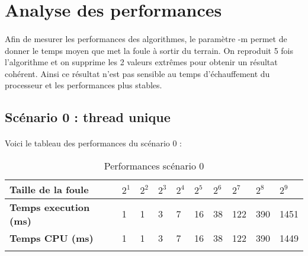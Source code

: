 \documentclass[12pt,oneside,a4paper]{article}
\begin{document}
\section{Analyse des performances}
\paragraph{}
Afin de mesurer les performances des algorithmes, le paramètre -m permet de 
donner le temps moyen que met la foule à sortir du terrain. On reproduit 5 fois
l'algorithme et on supprime les 2 valeurs extrêmes pour obtenir un résultat cohérent.
Ainsi ce résultat n'est pas sensible au temps d'échauffement du processeur et
les performances plus stables.

\subsection{Scénario 0 : thread unique}
\paragraph{}
Voici le tableau des performances du scénario 0 :

\begin{table}[h]
  \centering
  \small
  \begin{tabular}{llllllllll}
    \hline
    \multicolumn{1}{|l|}{\textbf{Taille de la foule}}                     & \multicolumn{1}{l|}{$2^1$} & \multicolumn{1}{l|}{$2^2$} & \multicolumn{1}{l|}{$2^3$} & \multicolumn{1}{l|}{$2^4$} & \multicolumn{1}{l|}{$2^5$} & \multicolumn{1}{l|}{$2^6$} & \multicolumn{1}{l|}{$2^7$} & \multicolumn{1}{l|}{$2^8$} & \multicolumn{1}{l|}{$2^9$} \\ \hline
    \multicolumn{1}{|l|}{\textbf{Temps execution (ms)}} & \multicolumn{1}{l|}{1}  & \multicolumn{1}{l|}{1}  & \multicolumn{1}{l|}{3}  & \multicolumn{1}{l|}{7}  & \multicolumn{1}{l|}{16}  & \multicolumn{1}{l|}{38}  & \multicolumn{1}{l|}{122}  & \multicolumn{1}{l|}{390}  & \multicolumn{1}{l|}{1451}  \\ \hline
    \multicolumn{1}{|l|}{\textbf{Temps CPU (ms)}}    & \multicolumn{1}{l|}{1}  & \multicolumn{1}{l|}{1}  & \multicolumn{1}{l|}{3}  & \multicolumn{1}{l|}{7}  & \multicolumn{1}{l|}{16}  & \multicolumn{1}{l|}{38}  & \multicolumn{1}{l|}{122}  & \multicolumn{1}{l|}{390}  & \multicolumn{1}{l|}{1449}  \\ \hline
                                                                          &                        &                        &                        &                        &                        &                        &                        &                        &                       
    \end{tabular}
  \caption{Performances scénario 0}
  \label{Performances scénario 0}
\end{table}
\end{document}
